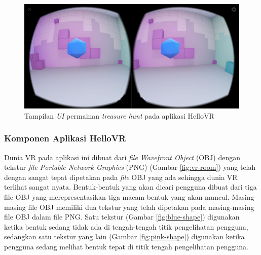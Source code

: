 \begin{figure}[h]
	\centering
		\includegraphics[width=6in]{Gambar/treasure_hunt.jpg}
	\caption{Tampilan \textit{UI} permainan \textit{treasure hunt} pada aplikasi HelloVR}
	\label{fig:treasure-hunt}
\end{figure}

\subsubsection{Komponen Aplikasi HelloVR}
Dunia VR pada aplikasi ini dibuat dari {\it file Wavefront Object} (OBJ) dengan tekstur {\it file Portable Network Graphics} (PNG) (Gambar \ref{fig:vr-room}) yang telah dengan sangat tepat dipetakan pada \textit{file} OBJ yang ada sehingga dunia VR terlihat sangat nyata. Bentuk-bentuk yang akan dicari pengguna dibuat dari tiga file OBJ yang merepresentasikan tiga macam bentuk yang akan muncul. Masing-masing file OBJ memiliki dua tekstur yang telah dipetakan pada masing-masing file OBJ dalam file PNG. Satu tekstur (Gambar \ref{fig:blue-shape}) digunakan ketika bentuk sedang tidak ada di tengah-tengah titik pengelihatan pengguna, sedangkan satu tekstur yang lain (Gambar \ref{fig:pink-shape}) digunakan ketika pengguna sedang melihat bentuk tepat di titik tengah pengelihatan pengguna.


